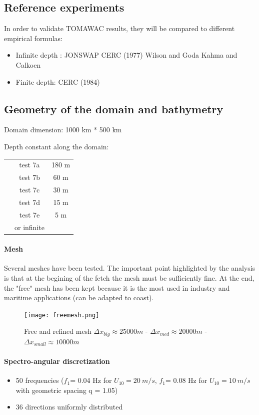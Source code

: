\subsection{Reference experiments}
In order to validate TOMAWAC results, they will be compared to different empirical formulas:
\begin{itemize}
\item Infinite depth :
\subitem JONSWAP \cite{Hasselmann1973}
\subitem CERC (1977) \cite{CERC77}
\subitem Wilson and Goda \cite{Wilson1965}
\subitem Kahma and Calkoen \cite{Kahma1992}
\item Finite depth:
\subitem CERC (1984)\cite{CERC84}
\end{itemize}
\subsection{Geometry of the domain and bathymetry}
Domain  dimension: 1000 km * 500 km

Depth constant along the domain:
\begin{tabular}{ccc}
 & test 7a & 180 m\\
 & test 7b & 60 m\\
& test 7c & 30 m\\
& test 7d & 15 m\\
& test 7e & 5 m\\
 & or infinite\\
\end{tabular}
\paragraph{Mesh}
Several meshes have been tested. The important point highlighted by the analysis is that at the begining of the fetch the mesh must be sufficiently fine. At the end, the "free" mesh has been kept because it is the most used in industry and maritime applications (can be adapted to coast).
\begin{figure}[H]
\centering
\texttt{[image: freemesh.png]}
\caption{Free and refined mesh $\Delta x_{big} \approx 25 000 m$ - $\Delta x_{med} \approx 20 000 m$ - $\Delta x_{small} \approx 10 000 m$}
\label{meshfet}
\end{figure}

\paragraph{Spectro-angular discretization}
\begin{itemize}
\item 50 frequencies ($f_1 $= 0.04 Hz for $U_{10} = 20~m/s$, $f_1 $= 0.08 Hz for $U_{10} = 10~m/s$ with geometric spacing q = 1.05)
\item 36 directions uniformly distributed
\end{itemize}

